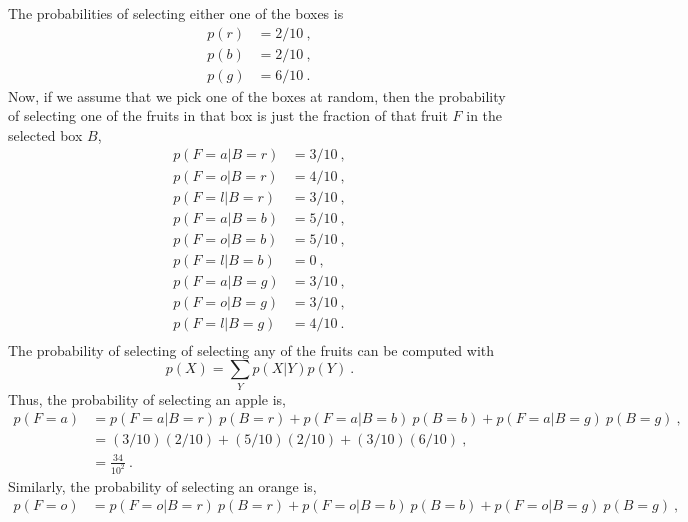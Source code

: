 \begin{solution}
    The probabilities of selecting either one of the boxes is
    \begin{equation*}
        \begin{split}
            p(r) & = 2 / 10\ , \\
            p(b) & = 2 / 10\ , \\
            p(g) & = 6 / 10\ .
        \end{split}
    \end{equation*}
    Now, if we assume that we pick one of the boxes at random, then the probability of selecting one of the fruits in that box is just the fraction of that fruit $F$ in the selected box $B$,
    \begin{equation*}
        \begin{aligned}
            p(F=a | B=r) & = 3/10\ ,\\
            p(F=o | B=r) & = 4/10\ ,\\
            p(F=l | B=r) & = 3/10\ ,\\
            p(F=a | B=b) & = 5/10\ ,\\
            p(F=o | B=b) & = 5/10\ ,\\
            p(F=l | B=b) & = 0\ ,\\
            p(F=a | B=g) & = 3/10\ ,\\
            p(F=o | B=g) & = 3/10\ ,\\
            p(F=l | B=g) & = 4/10\ .\\
        \end{aligned}
    \end{equation*}
    The probability of selecting of selecting any of the fruits can be computed with
    \begin{equation*}
        p(X) = \sum\limits_{Y} p(X|Y) p(Y)\ .
    \end{equation*}
    Thus, the probability of selecting an apple is,
    \begin{align*}
        p(F=a) & = p(F=a | B=r)\ p(B=r) + p(F=a | B=b)\ p(B=b) + p(F=a | B=g)\ p(B=g)\ ,\\
        & = (3/10)(2/10) + (5/10)(2/10) + (3/10)(6/10)\ ,\\
        & = \frac{34}{10^2}\ .
    \end{align*}
    Similarly, the probability of selecting an orange is,
    \begin{align*}
        p(F=o) & = p(F=o | B=r)\ p(B=r) + p(F=o | B=b)\ p(B=b) + p(F=o | B=g)\ p(B=g)\ ,\\

\end{align*}
\end{solution}
